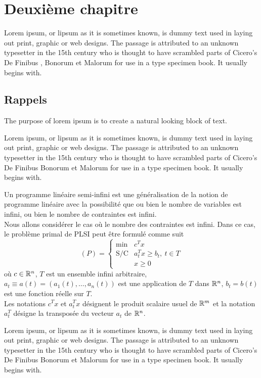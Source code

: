 \chapter{Deuxième chapitre}
Lorem ipsum, or lipsum as it is sometimes known, is dummy text used in laying out print, graphic or web designs. The passage is attributed to an unknown typesetter in the 15th century who is thought to have scrambled parts of Cicero's De Finibus \cite{b1}, Bonorum et Malorum for use in a type specimen book. It usually begins with.



\section{Rappels}
The purpose of lorem ipsum is to create a natural looking block of text.

Lorem ipsum, or lipsum as it is sometimes known, is dummy text used in laying out print, graphic or web designs. The passage is attributed to an unknown typesetter in the 15th century who is thought to have scrambled parts of Cicero's De Finibus Bonorum et Malorum for use in a type specimen book. It usually begins with.
\begin{definition}\label{321}
	Un programme linéaire semi-infini est une généralisation de la notion de programme linéaire avec la possibilité que ou bien le nombre de variables est infini, ou bien le nombre de contraintes est infini.\\
	
	Nous allons considérer le cas où le nombre des contraintes est infini. Dans ce cas, le problème primal de PLSI peut être formulé comme suit 
	\begin{equation}\label{II3}
		(P) = \left \lbrace \begin{array}{ll}
			\text{min}& c^Tx\\
			\text{S/C} & a^T_t x \geq b_t, \ t  \in T\\
			& x\geq 0
		\end{array}\right. 
	\end{equation}où $c \in \mathbb{R}^n$, $T$ est un ensemble infini arbitraire, $a_t \equiv a(t)=(a_1(t),\dots,a_n(t))$ est une application de $T$ dans $\mathbb{R}^n$, $b_t = b(t)$ est une fonction réelle sur $T$. \\ Les notations $c^T x$ et $ a_t^T x$ désignent le produit scalaire usuel de $\mathbb{R}^m$ et la notation $a_t^T$ désigne la transposée du vecteur $a_t$ de $\mathbb{R}^n$.	
\end{definition}
Lorem ipsum, or lipsum as it is sometimes known, is dummy text used in laying out print, graphic or web designs. The passage is attributed to an unknown typesetter in the 15th century who is thought to have scrambled parts of Cicero's De Finibus Bonorum et Malorum for use in a type specimen book. It usually begins with.



